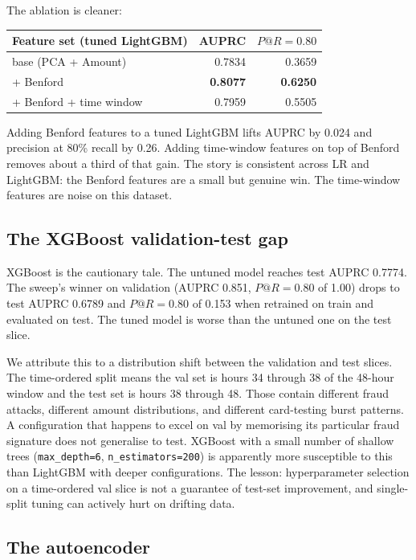 \documentclass{article}
\begin{document}
The ablation is cleaner:
\begin{center}
\begin{tabular}{lrr}
\toprule
Feature set (tuned LightGBM) & AUPRC & $P@R{=}0.80$ \\
\midrule
base (PCA + Amount)     & 0.7834 & 0.3659 \\
+ Benford               & \textbf{0.8077} & \textbf{0.6250} \\
+ Benford + time window & 0.7959 & 0.5505 \\
\bottomrule
\end{tabular}
\end{center}
Adding Benford features to a tuned LightGBM lifts AUPRC by 0.024 and precision at 80\% recall by 0.26. Adding time-window features on top of Benford removes about a third of that gain. The story is consistent across LR and LightGBM: the Benford features are a small but genuine win. The time-window features are noise on this dataset.

\subsection{The XGBoost validation-test gap}

XGBoost is the cautionary tale. The untuned model reaches test AUPRC 0.7774. The sweep's winner on validation (AUPRC 0.851, $P@R{=}0.80$ of 1.00) drops to test AUPRC 0.6789 and $P@R{=}0.80$ of 0.153 when retrained on train and evaluated on test. The tuned model is worse than the untuned one on the test slice.

We attribute this to a distribution shift between the validation and test slices. The time-ordered split means the val set is hours 34 through 38 of the 48-hour window and the test set is hours 38 through 48. Those contain different fraud attacks, different amount distributions, and different card-testing burst patterns. A configuration that happens to excel on val by memorising its particular fraud signature does not generalise to test. XGBoost with a small number of shallow trees (\texttt{max\_depth=6}, \texttt{n\_estimators=200}) is apparently more susceptible to this than LightGBM with deeper configurations. The lesson: hyperparameter selection on a time-ordered val slice is not a guarantee of test-set improvement, and single-split tuning can actively hurt on drifting data.

\subsection{The autoencoder}
\end{document}
